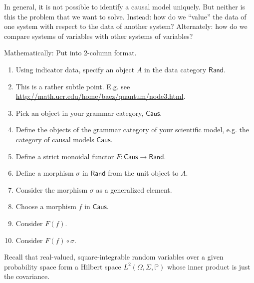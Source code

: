 \documentclass{article}
\theoremstyle{definition}
\newcommand{\redout}[1]{{\color{red}#1}}
\newcommand{\Cat}[1]{\mathsf{#1}}
\def\Rand{\Cat{Rand}}
\def\Caus{\Cat{Caus}}
\begin{document}
\redout{In general, it is not possible to identify a causal model uniquely. But neither is this the problem that we want to solve. Instead: how do we ``value'' the data of one system with respect to the data of another system? Alternately: how do we compare systems of variables with other systems of variables?}

Mathematically: \redout{Put into 2-column format.}

\begin{enumerate}
\item Using indicator data, specify an object $A$ in the data category $\Rand$. 
\item \redout{This is a rather subtle point. E.g. see \url{http://math.ucr.edu/home/baez/quantum/node3.html}.}
\item Pick an object in your grammar category, $\Caus$.
\item Define the objects of the grammar category of your scientific model, e.g. the category of causal models $\Caus$.
\item Define a strict monoidal functor $F : \Caus \to \Rand$.
\item Define a morphism $\sigma$ in $\Rand$ from the unit object to $A$.
\item Consider the morphism $\sigma$ as a generalized element.
\item Choose a morphism $f$ in $\Caus$.
\item Consider $F(f)$.
\item Consider $F(f) \circ \sigma$.
\end{enumerate}

Recall that real-valued, square-integrable random variables over a given probability space form a Hilbert space $L^2(\Omega, \Sigma, \mathbb{P})$ whose inner product is just the covariance. %
\end{document}
